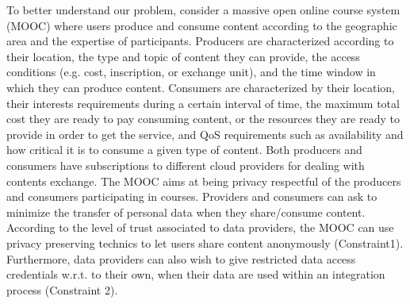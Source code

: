  

To better understand our problem, consider a massive open online course system (MOOC) where users produce and consume content according to the geographic area and the expertise of participants. 
Producers are characterized according to their location, the type and topic of  content  they can provide, the access conditions (e.g. cost, inscription, or exchange unit), and the time window in which they can produce content. 
Consumers are characterized by their location, their interests requirements during a certain interval of time, the maximum total cost they are ready to pay consuming content, or the resources they are ready to provide in order to get the service, and QoS requirements such as availability and how critical it is to consume a given type of content. Both producers and consumers have subscriptions to different cloud providers for dealing with contents exchange.
The MOOC  aims at being privacy respectful of the producers and consumers participating in courses.
 Providers  and consumers can ask to minimize the transfer of personal data  when they share/consume content.  According to the level of trust associated to data providers, the MOOC can use privacy preserving technics to let users share content anonymously  (Constraint1). Furthermore,  data providers can  also wish to give restricted data access credentials w.r.t. to their own, when their data are used  within  an integration process (Constraint 2).  
 
